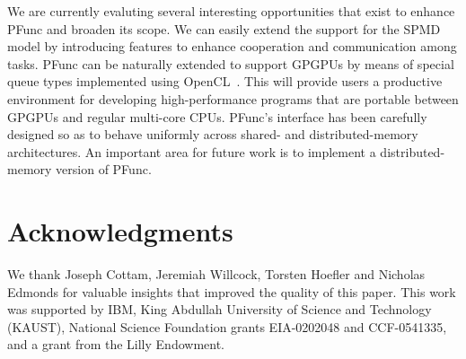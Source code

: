 \documentclass{sig-alternate}
\begin{document}
We are currently evaluting several interesting opportunities that exist to
enhance PFunc and broaden its scope.  We can easily extend the support for the
SPMD model by introducing features to enhance cooperation and communication
among tasks.  PFunc can be naturally extended to support GPGPUs by means of
special queue types implemented using OpenCL~\cite{MUNSHI08siggraph}. This will
provide users a productive environment for developing high-performance programs
that are portable between GPGPUs and regular multi-core CPUs.  PFunc's
interface has been carefully designed so as to behave uniformly across shared-
and distributed-memory architectures.  An important area for future work is to
implement a distributed-memory version of PFunc.

\section{Acknowledgments}
We thank Joseph Cottam, Jeremiah Willcock, Torsten Hoefler and Nicholas Edmonds
for valuable insights that improved the quality of this paper.  This work was
supported by IBM, King Abdullah University of Science and Technology (KAUST),
National Science Foundation grants EIA-0202048 and CCF-0541335, and a grant
from the Lilly Endowment.

\small


\end{document}
